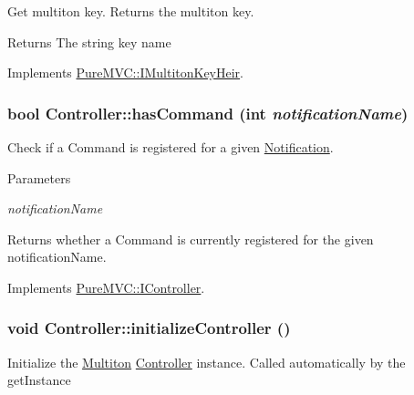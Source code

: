 Get multiton key. Returns the multiton key. \begin{DoxyReturn}{Returns}
The string key name 
\end{DoxyReturn}


Implements \hyperlink{class_pure_m_v_c_1_1_i_multiton_key_heir_aecccfb9898368c6377550ceae5730934}{PureMVC::IMultitonKeyHeir}.\hypertarget{class_pure_m_v_c_1_1_controller_ab434278b9236beb9d5ffb55482233ef9}{
\subsubsection[{hasCommand}]{\setlength{\rightskip}{0pt plus 5cm}bool Controller::hasCommand (int {\em notificationName})}}
\label{class_pure_m_v_c_1_1_controller_ab434278b9236beb9d5ffb55482233ef9}


Check if a Command is registered for a given \hyperlink{class_pure_m_v_c_1_1_notification}{Notification}. 
\begin{DoxyParams}{Parameters}
\item[{\em notificationName}]\end{DoxyParams}
\begin{DoxyReturn}{Returns}
whether a Command is currently registered for the given {\ttfamily notificationName}. 
\end{DoxyReturn}


Implements \hyperlink{class_pure_m_v_c_1_1_i_controller_a0cb56adf2c1300913af0458ba730cbf4}{PureMVC::IController}.\hypertarget{class_pure_m_v_c_1_1_controller_a071c576f4a0cee162f8f7355767dc247}{
\subsubsection[{initializeController}]{\setlength{\rightskip}{0pt plus 5cm}void Controller::initializeController ()}}
\label{class_pure_m_v_c_1_1_controller_a071c576f4a0cee162f8f7355767dc247}


Initialize the \hyperlink{class_pure_m_v_c_1_1_multiton}{Multiton} {\ttfamily \hyperlink{class_pure_m_v_c_1_1_controller}{Controller}} instance. Called automatically by the getInstance

